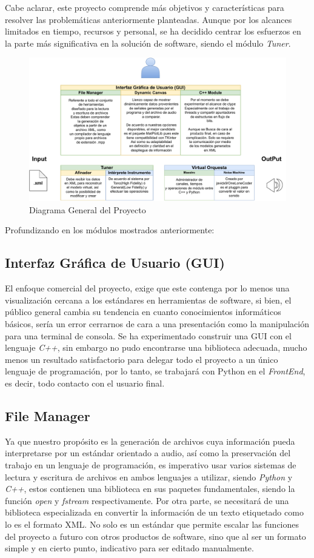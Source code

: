 \documentclass{book}
\begin{document}
	Cabe aclarar, este proyecto comprende más objetivos y características para resolver las problemáticas anteriormente planteadas. Aunque por los alcances limitados en tiempo, recursos y personal, se ha decidido centrar los esfuerzos en la parte más significativa en la solución de software, siendo el módulo \emph{Tuner}.
	\begin{figure}[h]
		\includegraphics[width=1.25\linewidth]{../Assets/images/musiC++_Diagram_cut}
		\caption{ Diagrama General del Proyecto}
	\end{figure} 
	
	\pagebreak
	Profundizando en los módulos mostrados anteriormente:
	\subsection*{Interfaz Gráfica de Usuario (GUI)}
	El enfoque comercial del proyecto, exige que este contenga por lo menos una visualización cercana a los estándares en herramientas de software, si bien, el público general cambia su tendencia en cuanto conocimientos informáticos básicos, sería un error cerrarnos de cara a una presentación como la manipulación para una terminal de consola. Se ha experimentado construir una GUI con el lenguaje \emph{C++}, sin embargo no pudo encontrarse una biblioteca adecuada, mucho menos un resultado satisfactorio para delegar todo el proyecto a un único lenguaje de programación, por lo tanto, se trabajará con Python en el \emph{FrontEnd}, es decir, todo contacto con el usuario final.\par
	\subsection*{File Manager}
	Ya que nuestro propósito es la generación de archivos cuya información pueda interpretarse por un estándar orientado a audio, así como la preservación del trabajo en un lenguaje de programación, es imperativo usar varios sistemas de lectura y escritura de archivos en ambos lenguajes a utilizar, siendo \emph{Python} y \emph{C++}, estos contienen una biblioteca en sus paquetes fundamentales, siendo la función \emph{open} y \emph{fstream} respectivamente. Por otra parte, se necesitará de una biblioteca especializada en convertir la información de un texto etiquetado como lo es el formato XML. No solo es un estándar que permite escalar las funciones del proyecto a futuro con otros productos de software, sino que al ser un formato simple y en cierto punto, indicativo para ser editado manualmente.
\end{document}
